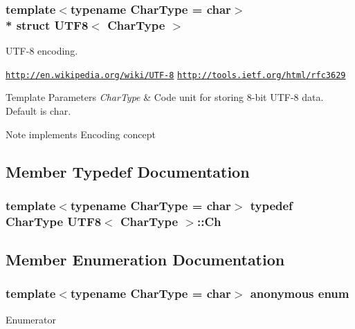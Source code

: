 \subsubsection*{template$<$typename Char\+Type = char$>$\\*
struct U\+T\+F8$<$ Char\+Type $>$}

U\+T\+F-\/8 encoding. 

\href{http://en.wikipedia.org/wiki/UTF-8}{\tt http\+://en.\+wikipedia.\+org/wiki/\+U\+T\+F-\/8} \href{http://tools.ietf.org/html/rfc3629}{\tt http\+://tools.\+ietf.\+org/html/rfc3629} 
\begin{DoxyTemplParams}{Template Parameters}
{\em Char\+Type} & Code unit for storing 8-\/bit U\+T\+F-\/8 data. Default is char. \\
\hline
\end{DoxyTemplParams}
\begin{DoxyNote}{Note}
implements Encoding concept 
\end{DoxyNote}


\subsection{Member Typedef Documentation}
\subsubsection[{\texorpdfstring{Ch}{Ch}}]{\setlength{\rightskip}{0pt plus 5cm}template$<$typename Char\+Type  = char$>$ typedef Char\+Type {\bf U\+T\+F8}$<$ Char\+Type $>$\+::{\bf Ch}}\hypertarget{structUTF8_a8e78c8113f3660178d8121b7d3e55890}{}\label{structUTF8_a8e78c8113f3660178d8121b7d3e55890}


\subsection{Member Enumeration Documentation}
\subsubsection[{\texorpdfstring{anonymous enum}{anonymous enum}}]{\setlength{\rightskip}{0pt plus 5cm}template$<$typename Char\+Type  = char$>$ anonymous enum}\hypertarget{structUTF8_a6d7cd5f1f72db45d041344c35f47da74}{}\label{structUTF8_a6d7cd5f1f72db45d041344c35f47da74}
\begin{Desc}
\item[Enumerator]\par
\begin{description}
\item[{\em 
support\+Unicode\hypertarget{structUTF8_a6d7cd5f1f72db45d041344c35f47da74a1a78b02dbcc9ddfd12f86a51cddf8fad}{}\label{structUTF8_a6d7cd5f1f72db45d041344c35f47da74a1a78b02dbcc9ddfd12f86a51cddf8fad}
}]\end{description}
\end{Desc}


